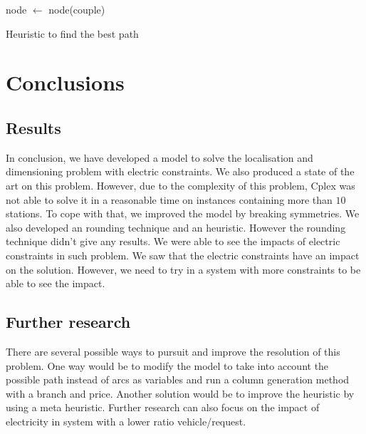 \begin{bibunit}[ieeetr]
\begin{algorithm}
{{ }
 node $\gets$ node(couple)\;
}
\caption{Heuristic to find the best path}
\label{algo:max}
\end{algorithm}

\section{Conclusions}
\subsection{Results}
In conclusion, we have developed a model to solve the localisation and dimensioning problem with electric constraints.
We also produced a state of the art on this problem.
However, due to the complexity of this problem, Cplex was not able to solve it in a reasonable time on instances containing more than $10$ stations.
To cope with that, we improved the model by breaking symmetries.
We also developed an rounding technique and an heuristic.
However the rounding technique didn't give any results.
We were able to see the impacts of electric constraints in such problem. We saw that the electric constraints have an impact on the solution.
However, we need to try in a system with more constraints to be able to see the impact.

\subsection{Further research}
There are several possible ways to pursuit and improve the resolution of this problem.
One way would be to modify the model to take into account the possible path instead of arcs as variables and run a column generation method with a branch and price.
Another solution would be to improve the heuristic by using a meta heuristic.
Further research can also focus on the impact of electricity in system with a lower ratio vehicle/request.

\newpage
{}
\renewcommand{\bibname}{Bibliography of chapter \thechapter}
\end{bibunit}
